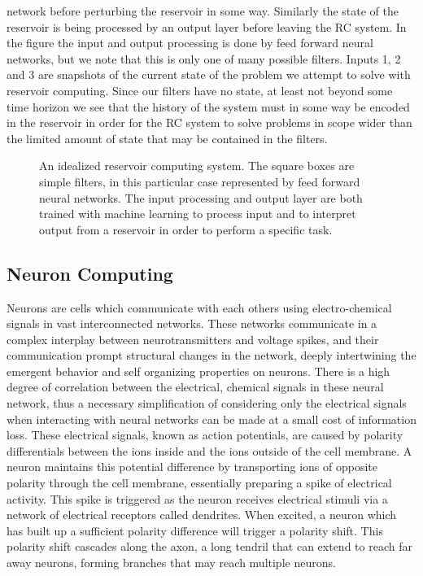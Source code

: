 network before perturbing the reservoir in some way.
Similarly the state of the reservoir is being processed by an output layer
before leaving the RC system.
In the figure the input and output processing is done by feed forward neural
networks, but we note that this is only one of many possible filters.
Inputs 1, 2 and 3 are snapshots of the current state of the problem we attempt
to solve with reservoir computing.
Since our filters have no state, at least not beyond some time horizon we see
that the history of the system must in some way be encoded in the reservoir in
order for the RC system to solve problems in scope wider than the limited amount
of state that may be contained in the filters.
\begin{figure*}[h]
  
  \caption{An idealized reservoir computing system.
  The square boxes are simple filters, in this particular case represented by
  feed forward neural networks.
  The input processing and output layer are both trained with machine learning
  to process input and to interpret output from a reservoir in order to perform
  a specific task.}
  \label{fig:RC}
\end{figure*}
\subsection{Neuron Computing}
Neurons are cells which communicate with each others using electro-chemical
signals in vast interconnected networks.
These networks communicate in a complex interplay between neurotransmitters and voltage
spikes, and their communication prompt structural changes in the network,
deeply intertwining the emergent behavior and self organizing properties on neurons.
There is a high degree of correlation between the electrical, chemical signals
in these neural network, thus a necessary simplification of considering only the
electrical signals when interacting with neural networks can be made at a small
cost of information loss.
These electrical signals, known as action potentials, are caused
by polarity differentials between the ions inside and the ions outside of the
cell membrane.
A neuron maintains this potential difference by transporting ions of opposite
polarity through the cell membrane, essentially preparing a spike of electrical
activity.
This spike is triggered as the neuron receives electrical stimuli via a network
of electrical receptors called dendrites.
When excited, a neuron which has built up a sufficient polarity difference will
trigger a polarity shift.
This polarity shift cascades along the axon, a long tendril that can extend to
reach far away neurons, forming branches that may reach multiple neurons.
